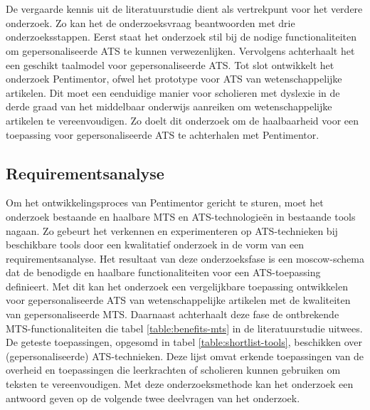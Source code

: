 
\chapter{}%
\label{ch:methodologie}


De vergaarde kennis uit de literatuurstudie dient als vertrekpunt voor het verdere onderzoek. Zo kan het de onderzoeksvraag beantwoorden met drie onderzoeksstappen. Eerst staat het onderzoek stil bij de nodige functionaliteiten om gepersonaliseerde ATS te kunnen verwezenlijken. Vervolgens achterhaalt het een geschikt taalmodel voor gepersonaliseerde ATS. Tot slot ontwikkelt het onderzoek Pentimentor, ofwel het prototype voor ATS van wetenschappelijke artikelen. Dit moet een eenduidige manier voor scholieren met dyslexie in de derde graad van het middelbaar onderwijs aanreiken om wetenschappelijke artikelen te vereenvoudigen. Zo doelt dit onderzoek om de haalbaarheid voor een toepassing voor gepersonaliseerde ATS te achterhalen met Pentimentor. 

\section{Requirementsanalyse}
\label{sec:requirementsanalyse}

Om het ontwikkelingsproces van Pentimentor gericht te sturen, moet het onderzoek bestaande en haalbare MTS en ATS-technologieën in bestaande tools nagaan. Zo gebeurt het verkennen en experimenteren op ATS-technieken bij beschikbare tools door een kwalitatief onderzoek in de vorm van een requirementsanalyse. Het resultaat van deze onderzoeksfase is een moscow-schema dat de benodigde en haalbare functionaliteiten voor een ATS-toepassing definieert. Met dit kan het onderzoek een vergelijkbare toepassing ontwikkelen voor gepersonaliseerde ATS van wetenschappelijke artikelen met de kwaliteiten van gepersonaliseerde MTS. Daarnaast achterhaalt deze fase de ontbrekende MTS-functionaliteiten die tabel \ref{table:benefits-mts} in de literatuurstudie uitwees. De geteste toepassingen, opgesomd in tabel \ref{table:shortlist-tools}, beschikken over (gepersonaliseerde) ATS-technieken. Deze lijst omvat erkende toepassingen van de overheid en toepassingen die leerkrachten of scholieren kunnen gebruiken om teksten te vereenvoudigen. Met deze onderzoeksmethode kan het onderzoek een antwoord geven op de volgende twee deelvragen van het onderzoek.

